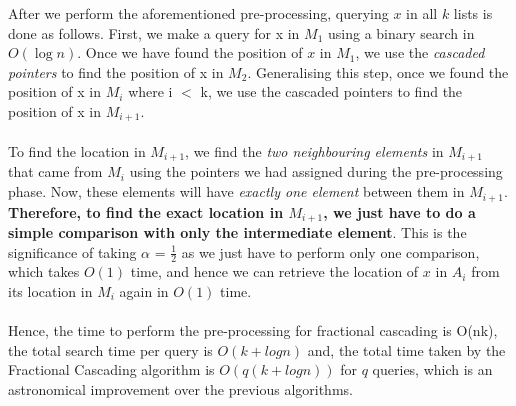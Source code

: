 \documentclass[11pt]{article}
\begin{document}
After we perform the aforementioned pre-processing, querying $x$ in all $k$ lists is done as follows.
First, we make a query for x in $M_1$ using a binary search in $O(\log n)$. Once we have found the position of $x$ in $M_1$, we use the \textit{cascaded pointers} to find the position of x in $M_2$. Generalising this step, once we found the position of x in $M_i$ where i $<$ k, we use the cascaded pointers to find the position of x in $M_{i+1}$. \\ \\
To find the location in $M_{i+1}$, we find the \textit{two neighbouring elements} in $M_{i+1}$ that came from $M_i$ using the pointers we had assigned during the pre-processing phase. Now, these elements will have \textit{exactly one element} between them in $M_{i+1}$. \textbf{Therefore, to find the exact location in $M_{i+1}$, we just have to do a simple comparison with only the intermediate element}. This is the significance of taking $\alpha$ = $\frac{1}{2}$ as we just have to perform only one comparison, which takes $O(1)$ time, and hence we can retrieve the location of $x$ in $A_i$ from its location in $M_i$ again in $O(1)$ time. \\ \\

Hence, the time to perform the pre-processing for fractional cascading is O(nk), the total search time per query is $O(k+log n)$ and, the total time taken by the Fractional Cascading algorithm is $O(q(k+logn))$ for $q$ queries, which is an astronomical improvement over the previous algorithms.



\end{document}
